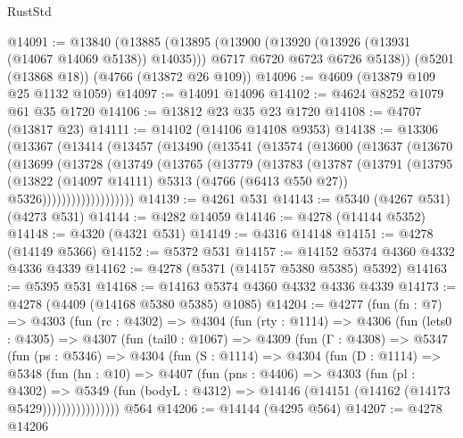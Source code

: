 \begin{lexlean}{RustStd}
\begin{coremodule}
@14091 := @13840
    (@13885
      (@13895
        (@13900 (@13920 (@13926 (@13931 (@14067 @14069 @5138)) @14035)))
        @6717
        @6720
        @6723
        @6726
        @5138))
    (@5201 (@13868 @18))
    (@4766 (@13872 @26 @109))
@14096 := @4609 (@13879 @109 @25 @1132 @1059)
@14097 := @14091 @14096
@14102 := @4624 @8252 @1079 @61 @35 @1720
@14106 := @13812 @23 @35 @23 @1720
@14108 := @4707 (@13817 @23)
@14111 := @14102 (@14106 @14108 @9353)
@14138 := @13306
    (@13367
      (@13414
        (@13457
          (@13490
            (@13541
              (@13574
                (@13600
                  (@13637
                    (@13670
                      (@13699
                        (@13728
                          (@13749
                            (@13765
                              (@13779
                                (@13783
                                  (@13787
                                    (@13791
                                      (@13795
                                        (@13822
                                          (@14097 @14111)
                                          @5313
                                          (@4766 (@6413 @550 @27))
                                          @5326)))))))))))))))))))
@14139 := @4261 @531
@14143 := @5340 (@4267 @531) (@4273 @531)
@14144 := @4282 @14059
@14146 := @4278 (@14144 @5352)
@14148 := @4320 (@4321 @531)
@14149 := @4316 @14148
@14151 := @4278 (@14149 @5366)
@14152 := @5372 @531
@14157 := @14152 @5374 @4360 @4332 @4336 @4339
@14162 := @4278 (@5371 (@14157 @5380 @5385) @5392)
@14163 := @5395 @531
@14168 := @14163 @5374 @4360 @4332 @4336 @4339
@14173 := @4278 (@4409 (@14168 @5380 @5385) @1085)
@14204 := @4277
    (fun (fn : @7) =>
    @4303
      (fun (rc : @4302) =>
      @4304
        (fun (rty : @1114) =>
        @4306
          (fun (lets0 : @4305) =>
          @4307
            (fun (tail0 : @1067) =>
            @4309
              (fun (Γ : @4308) =>
              @5347
                (fun (ps : @5346) =>
                @4304
                  (fun (S : @1114) =>
                  @4304
                    (fun (D : @1114) =>
                    @5348
                      (fun (hn : @10) =>
                      @4407
                        (fun (pns : @4406) =>
                        @4303
                          (fun (pl : @4302) =>
                          @5349
                            (fun (bodyL : @4312) =>
                            @14146 (@14151 (@14162 (@14173 @5429))))))))))))))))
    @564
@14206 := @14144 (@4295 @564)
@14207 := @4278 @14206

\end{coremodule}
\end{lexlean}
